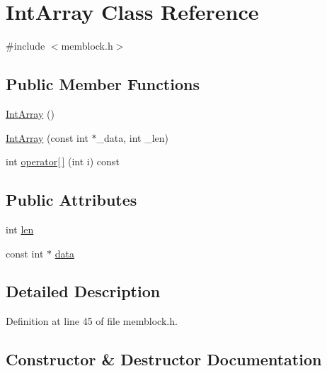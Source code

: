 \hypertarget{class_int_array}{}\section{Int\+Array Class Reference}
\label{class_int_array}


{\ttfamily \#include $<$memblock.\+h$>$}

\subsection*{Public Member Functions}
\begin{DoxyCompactItemize}
\item 
\hyperlink{class_int_array_a07b52d3e5b0cfc4462bb17f12b6dd317}{Int\+Array} ()
\item 
\hyperlink{class_int_array_af85a1df528aca0755e211fb57939eabd}{Int\+Array} (const int $\ast$\+\_\+data, int \+\_\+len)
\item 
int \hyperlink{class_int_array_a9ec7c594eacbc68f4e4de9725223488d}{operator\mbox{[}$\,$\mbox{]}} (int i) const
\end{DoxyCompactItemize}
\subsection*{Public Attributes}
\begin{DoxyCompactItemize}
\item 
int \hyperlink{class_int_array_a5221f2c5a60b4406fc645b7fe1971a27}{len}
\item 
const int $\ast$ \hyperlink{class_int_array_a5e9f0ecac061ffdba83396e7eeeb49e6}{data}
\end{DoxyCompactItemize}


\subsection{Detailed Description}


Definition at line 45 of file memblock.\+h.



\subsection{Constructor \& Destructor Documentation}
\mbox{\label{class_int_array_a07b52d3e5b0cfc4462bb17f12b6dd317}} 
